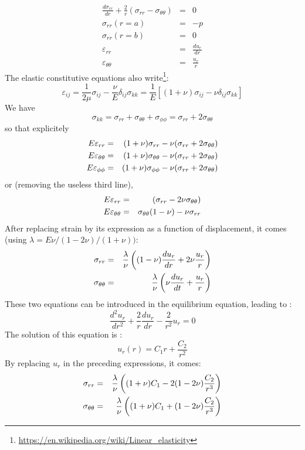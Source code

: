 \begin{eqnarray}
\frac{d\sigma_{rr}}{dr} + \frac{2}{r}(\sigma_{rr}-\sigma_{\theta\theta})&=&0 \\
\sigma_{rr}(r=a) &=& -p\\
\sigma_{rr}(r=b) &=& 0 \\
\varepsilon_{rr} &=& \frac{du_r}{dr} \\
\varepsilon_{\theta\theta} &=& \frac{u_r}{r} 
\end{eqnarray}
The elastic constitutive equations also write\footnote{\url{
https://en.wikipedia.org/wiki/Linear_elasticity}}:
\[
\varepsilon_{ij} 
= \frac{1}{2\mu} \sigma_{ij}  - \frac{\nu}{E} \delta_{ij} \sigma_{kk}
= \frac{1}{E} \left[ (1+\nu)\sigma_{ij} -\nu\delta_{ij}\sigma_{kk}  \right]
\]
We have
\[
\sigma_{kk} 
= \sigma_{rr} + \sigma_{\theta\theta} + \sigma_{\phi\phi}  
= \sigma_{rr} + 2\sigma_{\theta\theta} 
\]
so that explicitely 
\begin{eqnarray}
E \varepsilon_{rr} &=&    (1+\nu)\sigma_{rr} -\nu ( \sigma_{rr} + 2\sigma_{\theta\theta}    )\nonumber \\
E \varepsilon_{\theta\theta} &=&    (1+\nu)\sigma_{\theta\theta} -\nu( \sigma_{rr} + 2\sigma_{\theta\theta}) \nonumber\\
E \varepsilon_{\phi\phi} &=&   (1+\nu)\sigma_{\phi\phi} -\nu( \sigma_{rr} + 2\sigma_{\theta\theta}    ) \nonumber
\end{eqnarray}
or (removing the useless third line),
\begin{eqnarray}
E \varepsilon_{rr} &=& (\sigma_{rr}-2 \nu \sigma_{\theta\theta}) \nonumber\\
E \varepsilon_{\theta\theta} &=& \sigma_{\theta\theta} (1-\nu) - \nu \sigma_{rr}
\end{eqnarray}
After replacing strain by its expression as a function of displacement, 
it comes (using $\lambda = E \nu /(1-2\nu)/(1+\nu) )$:
\begin{eqnarray}
\sigma_{rr} &=& \frac{\lambda}{\nu}
\left((1-\nu)\frac{du_r}{dr} + 2\nu \frac{u_r}{r}\right) \nonumber\\
\sigma_{\theta\theta} &=& \frac{\lambda}{\nu}
\left(\nu \frac{du_r}{dt} + \frac{u_r}{r}\right)
\end{eqnarray}
These two equations can be introduced in the equilibrium equation, leading to :
\[
\frac{d^2 u_r}{dr^2} + \frac{2}{r} \frac{du_r}{dr} -\frac{2}{r^2}u_r = 0
\]
The solution of this equation is :
\[
u_r(r) = C_1 r + \frac{C_2}{r^2}
\]
By replacing $u_r$ in the preceding expressions, it comes:
\begin{eqnarray}
\sigma_{rr} &=& \frac{\lambda}{\nu}
\left((1+\nu)C_1 - 2(1-2\nu)\frac{C_2}{r^3}\right) \nonumber\\
\sigma_{\theta\theta} &=& \frac{\lambda}{\nu}
\left((1+\nu)C_1 + (1-2\nu)\frac{C_2}{r^3}\right) 
\end{eqnarray}
